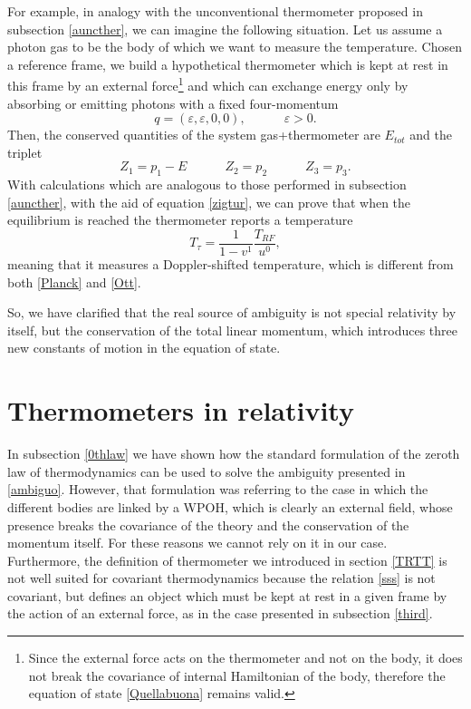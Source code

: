 \documentclass[twocolumn,usenatbib]{mnras2}
\newcommand{\spc}{\quad \quad \quad}
\begin{document}
For example, in analogy with the unconventional thermometer proposed in subsection \ref{auncther}, we can imagine the following situation. Let us assume a photon gas to be the body of which we want to measure the temperature. Chosen a reference frame, we build a hypothetical thermometer which is kept at rest in this frame by an external force\footnote{Since the external force acts on the thermometer and not on the body, it does not break the covariance of internal Hamiltonian of the body, therefore the equation of state \eqref{Quellabuona} remains valid.} and which can exchange energy only by absorbing or emitting photons with a fixed four-momentum 
\begin{equation}
q=(\varepsilon,\varepsilon,0,0),  \spc  \varepsilon >0 . 
\end{equation}  
Then, the conserved quantities of the system gas+thermometer are $E_{tot}$ and the triplet
\begin{equation}
Z_1 =  p_1 - E \spc Z_2 = p_2  \spc  Z_3 = p_3.
\end{equation} 
With calculations which are analogous to those performed in subsection \ref{auncther}, with the aid of equation \eqref{zigtur}, we can prove that when the equilibrium is reached the thermometer reports a temperature
\begin{equation}\label{bgbgbgb}
T_\tau = \dfrac{1}{ 1-  v^1} \dfrac{T_{RF}}{u^0},
\end{equation}
meaning that it measures a Doppler-shifted temperature, which is different from both \eqref{Planck} and \eqref{Ott}.


So, we have clarified that the real source of ambiguity is not special relativity by itself, but the conservation of the total linear momentum, which introduces three new constants of motion in the equation of state. 


\section{Thermometers in relativity}\label{qpwodioemfowemfmo}

In subsection \ref{0thlaw} we have shown how the standard formulation of the zeroth law of thermodynamics can be used to solve the ambiguity presented in \ref{ambiguo}. However, that formulation was referring to the case in which the different bodies are linked by a WPOH, which is clearly an external field, whose presence breaks the covariance of the theory and the conservation of the momentum itself. For these reasons we cannot rely on it in our case. Furthermore, the definition of thermometer we introduced in section \ref{TRTT} is not well suited for covariant thermodynamics because the relation \eqref{sss} is not covariant, but defines an object which must be kept at rest in a given frame by the action of an external force, as in the case presented in subsection \ref{third}.
\end{document}
